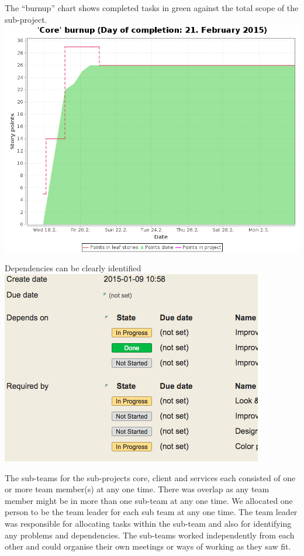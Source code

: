 The “burnup” chart shows completed tasks in green against the total scope of the sub-project. 
\includegraphics[scale=0.3]{./images/burnup_chart.png}

Dependencies can be clearly identified \\
\includegraphics[]{./images/dependencies.png}

The sub-teams for the sub-projects core, client and services each consisted of one or more team member(s) at any one time.  There was overlap as any team member might be in more than one sub-team at any one time.  We allocated one person to be the team leader for each sub team at any one time.  The team leader was responsible for allocating tasks within the sub-team and also for identifying any problems and dependencies.  The sub-teams worked independently from each other and could organise their own meetings or ways of working as they saw fit.

